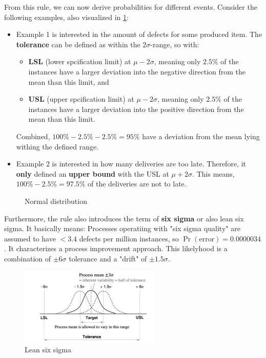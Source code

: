 From this rule, we can now derive probabilities for different events. Consider the following examples, also visualized in \ref{fig:2_three_sigma_examples}:
\begin{itemize}
  \item Example 1 is interested in the amount of defects for some produced item. The \textbf{tolerance} can be defined as within the $2\sigma$-range, so with:
  \begin{itemize}
    \item \textbf{LSL} (lower spcification limit) at $\mu-2\sigma$, meaning only $2.5\%$ of the instances have a larger deviation into the negative direction from the mean than this limit, and
    \item \textbf{USL} (upper spcification limit) at $\mu-2\sigma$, meaning only $2.5\%$ of the instances have a larger deviation into the positive direction from the mean than this limit.
  \end{itemize}
  Combined, $100\%-2.5\%-2.5\%=95\%$ have a deviation from the mean lying withing the defined range.
  \item Example 2 is interested in how many deliveries are too late. Therefore, it \textbf{only} defined an \textbf{upper bound} with the USL at $\mu+2\sigma$. This means, $100\%-2.5\%=97.5\%$ of the deliveries are not to late.
\end{itemize}

\begin{figure}[H]
  \centering
  \hspace*{0.05\textwidth}
  \caption{Normal distribution}
  \label{fig:2_three_sigma_examples}
\end{figure}

Furthermore, the rule also introduces the term of \textbf{six sigma} or also lean six sigma. It basically means: Processes operatiing with "six sigma quality" are assumed to have $< 3.4$ defects per million instances, so $\Pr(\text{error})=0.0000034$. It characterizes a process improvement approach. This likelyhood is a combination of $\pm6\sigma$ tolerance and a "drift" of $\pm1.5\sigma$. 

\begin{figure}[H]
  \centering
  \includegraphics[width=0.6\textwidth]{assets/visualization_and_extraction/lean_six_sigma.png}
  \caption{Lean six sigma}
  \label{fig:2_lean_six_sigma}
\end{figure}

